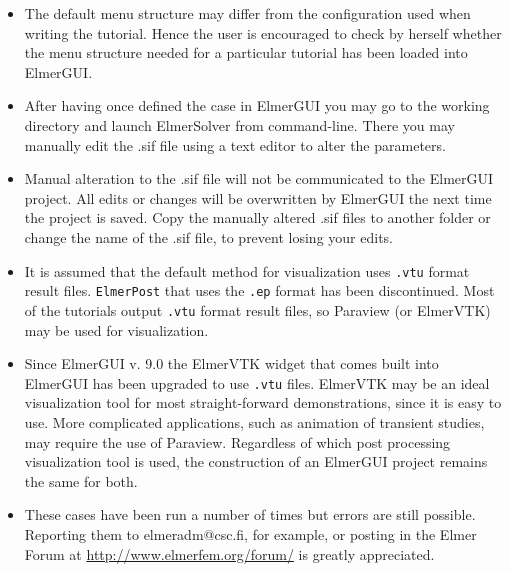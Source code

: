 \begin{itemize}
%
\item The default menu structure may differ from the configuration used when writing the tutorial. Hence the user is encouraged to check by herself whether the menu structure needed for a particular tutorial has been loaded into ElmerGUI. 
%
\item After having once defined the case in ElmerGUI you may go to the working directory and launch ElmerSolver from command-line. There you may manually edit the .sif file using a text editor to alter the parameters.
%
\item Manual alteration to the .sif file will not be communicated to the ElmerGUI project. All edits or changes will be overwritten by ElmerGUI the next time the project is saved.  Copy the manually altered .sif files to another folder or change the name of the .sif file, to prevent losing your edits.
%
\item It is assumed that the default method for visualization uses \texttt{.vtu} format result files.  \texttt{ElmerPost} that uses the \texttt{.ep} format has been discontinued.  Most of the tutorials output \texttt{.vtu} format result files, so Paraview (or ElmerVTK) may be used for visualization.
  
\item Since ElmerGUI v. 9.0 the ElmerVTK widget that comes built into ElmerGUI has been upgraded to use \texttt{.vtu} files. ElmerVTK may be an ideal visualization tool for most straight-forward demonstrations, since it is easy to use.  More complicated applications, such as animation of transient studies, may require the use of Paraview.  Regardless of which post processing visualization tool is used, the construction of an ElmerGUI project remains the same for both.
%
\item These cases have been run a number of times but errors are still possible.  Reporting them to elmeradm@csc.fi, for example, or posting in the Elmer Forum at \url{http://www.elmerfem.org/forum/} is greatly appreciated. 
\end{itemize}







